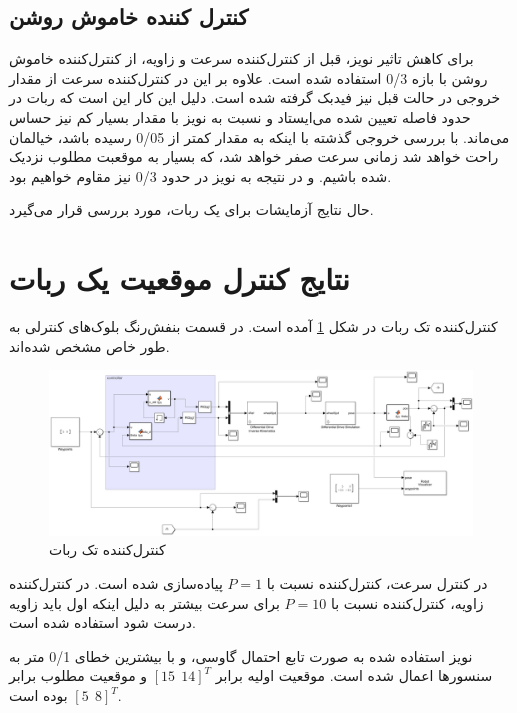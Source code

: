 \subsection{کنترل کننده خاموش روشن}
برای کاهش تاثیر نویز، قبل از کنترل‌کننده سرعت و زاویه، از کنترل‌کننده خاموش روشن با بازه 0/3 استفاده شده است. علاوه بر این در کنترل‌کننده سرعت از مقدار خروجی در حالت قبل نیز فیدبک گرفته شده است. دلیل این کار این است که ربات در حدود فاصله تعیین شده می‌ایستاد و نسبت به نویز با مقدار بسیار کم نیز حساس می‌ماند. با بررسی خروجی گذشته با اینکه به مقدار کمتر از 0/05 رسیده باشد، خیالمان راحت خواهد شد زمانی سرعت صفر خواهد شد، که بسیار به موقعبت مطلوب نزدیک شده باشیم. و در نتیجه به نویز در حدود 0/3 نیز مقاوم خواهیم بود.

حال نتایج آزمایشات برای یک ربات، مورد بررسی قرار می‌گیرد.

\section{نتایج کنترل موقعیت یک ربات}
کنترل‌کننده تک ربات در شکل \ref{Fig 1-robot-controller} آمده است. در قسمت بنفش‌رنگ بلوک‌های کنترلی به طور خاص مشخص شده‌اند.
\begin{figure}[!h] 
	\centering
 	\includegraphics[scale=0.16]{Images/1-robot controller.png}
	\caption{کنترل‌کننده تک ربات} \label{Fig 1-robot-controller}
\end{figure}
 
 در کنترل سرعت، کنترل‌کننده نسبت با $P=1$ پیاده‌سازی شده است. در کنترل‌کننده زاویه، کنترل‌کننده نسبت با $P=10$ برای سرعت بیشتر به دلیل اینکه اول باید زاویه درست شود استفاده شده است.
 
 نویز استفاده شده به صورت تابع احتمال گاوسی، و با بیشترین خطای 0/1 متر به سنسورها اعمال شده است. موقعیت اولیه برابر $[15~~14]^T$ و موقعیت مطلوب برابر $[5~~8]^T$ بوده است.
 
